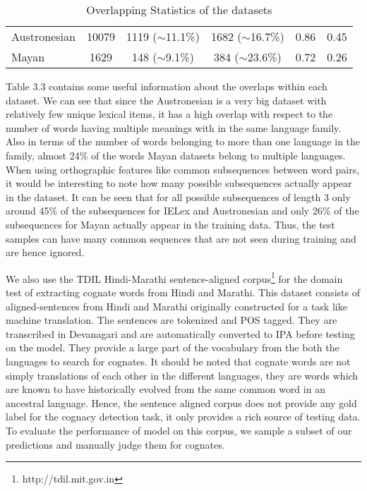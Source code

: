 \begin{table}[ht]
\begin{tabular}{lccccc}
Austronesian                                                               & 10079                                                                               & 1119 ($\sim$11.1\%)                                                                          & 1682 ($\sim$16.7\%)                                                                                    & 0.86                                              & 0.45                                              \\
Mayan                                                                      & 1629                                                                                & 148 ($\sim$9.1\%)                                                                            & 384 ($\sim$23.6\%)                                                                                     & 0.72                                              & 0.26                                             
\end{tabular}
\label{overlaptable}
\caption{Overlapping Statistics of the datasets}
\end{table}

Table 3.3 contains some useful information about the overlaps within each dataset. We can see that since the Austronesian is a very big dataset with relatively few unique lexical items, it has a high overlap with respect to the number of words having multiple meanings with in the same language family. Also in terms of the number of words belonging to more than one language in the family, almost 24\% of the words Mayan datasets belong to multiple languages. When using orthographic features like common subsequences between word pairs, it would be interesting to note how many possible subsequences actually appear in the dataset. It can be seen that for all possible subsequences of length 3 only around 45\% of the subsequences for IELex and Austronesian and only 26\% of the subsequences for Mayan actually appear in the training data. Thus, the test samples can have many common sequences that are not seen during training and are hence ignored.

We also use the TDIL Hindi-Marathi sentence-aligned corpus\footnote{http://tdil.mit.gov.in} for the domain test of extracting cognate words from Hindi and Marathi. This dataset consists of aligned-sentences from Hindi and Marathi originally constructed for a task like machine translation. The sentences are tokenized and POS tagged. They are transcribed in Devanagari and are automatically converted to IPA before testing on the model. They  provide a large part of the vocabulary from the both the languages to search for cognates. It should be noted that cognate words are not simply translations of each other in the different languages, they are words which are known to have historically evolved from the same common word in an ancestral language. Hence, the sentence aligned corpus does not provide any gold label for the cognacy detection task, it only provides a rich source of testing data. To evaluate the performance of model on this corpus, we sample a subset of our predictions and manually judge them for cognates.
